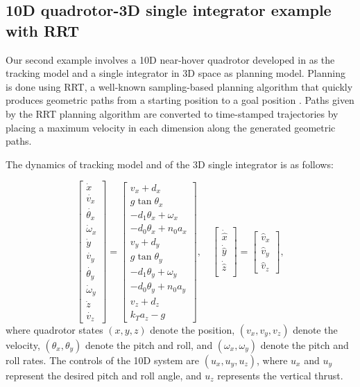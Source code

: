 \subsection{10D quadrotor-3D single integrator example with RRT\label{sec:resultsRRT}}

Our second example involves a 10D near-hover quadrotor developed in \cite{Bouffard12} as the tracking model and a single integrator in 3D space as planning model.
Planning is done using RRT, a well-known sampling-based planning algorithm that quickly produces geometric paths from a starting position to a goal position \cite{Kuffner2000,Kavraki1996}.
Paths given by the RRT planning algorithm are converted to time-stamped trajectories by placing a maximum velocity in each dimension along the generated geometric paths.

The dynamics of tracking model and of the 3D single integrator is as follows:

\begin{equation}
\label{eq:Quad10D_dyn}
\begin{bmatrix}
\dot{x}\\
\dot{v_x}\\
\dot{\theta_x}\\
\dot\omega_x\\
\dot{y}\\
\dot{v_y}\\
\dot{\theta_y}\\
\dot\omega_y\\
\dot{z}\\
\dot{v_z}
\end{bmatrix}
=
\begin{bmatrix}
v_x + d_x\\
g \tan \theta_x\\
-d_1 \theta_x + \omega_x\\
-d_0 \theta_x + n_0 a_x\\
v_y + d_y\\
g \tan \theta_y\\
-d_1 \theta_y + \omega_y\\
-d_0 \theta_y + n_0 a_y\\
v_z + d_z\\
k_T a_z - g
\end{bmatrix}, \quad
\begin{bmatrix}
\dot{\hat x}\\
\dot{\hat y}\\
\dot{\hat z}\\
\end{bmatrix} =
\begin{bmatrix}
\hat v_x \\
\hat v_y \\
\hat v_z
\end{bmatrix},
\end{equation}
\noindent where quadrotor states $(x, y, z)$ denote the position, $(v_x, v_y, v_z)$ denote the velocity, $(\theta_x, \theta_y)$ denote the pitch and roll, and $(\omega_x, \omega_y)$ denote the pitch and roll rates. 
The controls of the 10D system are $(u_x, u_y, u_z)$, where $u_x$ and $u_y$ represent the desired pitch and roll angle, and $u_z$ represents the vertical thrust.

